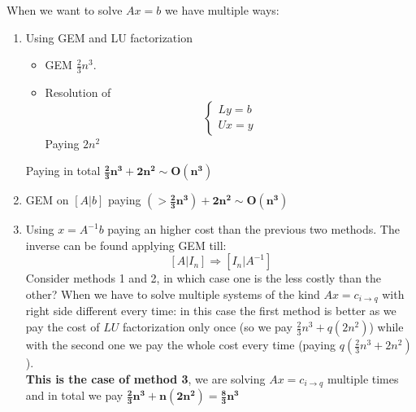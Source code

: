 When we want to solve $Ax=b$ we have multiple ways:
\begin{enumerate}
    \item Using GEM and LU factorization
    \begin{itemize}
        \item GEM $\frac{2}{3}n^3$.
        \item Resolution of
        $$
        \begin{cases}
            Ly=b\\
            Ux=y
        \end{cases}
        $$
        Paying $2n^2$
    \end{itemize}
    Paying in total $\mathbf{\frac{2}{3}n^3+2n^2\sim O(n^3)}$
    \item GEM on $\left[A|b\right]$ paying $\mathbf{(>\frac{2}{3}n^3)+2n^2\sim O(n^3)}$
    \item Using $x=A^{-1}b$ paying an higher cost than the previous two methods. The inverse can be found applying GEM till:
    $$\left[A|I_n\right]\Rightarrow \left[I_n|A^{-1}\right]$$
    Consider methods 1 and 2, in which case one is the less costly than the other? When we have to solve multiple systems of the kind $Ax=c_{i\rightarrow q}$ with right side different every time: in this case the first method is better as we pay the cost of $LU$ factorization only once (so we pay $\frac{2}{3}n^3+q(2n^2)$) while with the second one we pay the whole cost every time (paying $q\left(\frac{2}{3}n^3+2n^2\right)$).\\
    \textbf{This is the case of method 3}, we are solving $Ax=c_{i\rightarrow q}$   multiple times and in total we pay $\mathbf{\frac{2}{3}n^3+n(2n^2)=\frac{8}{3}n^3}$
\end{enumerate}


